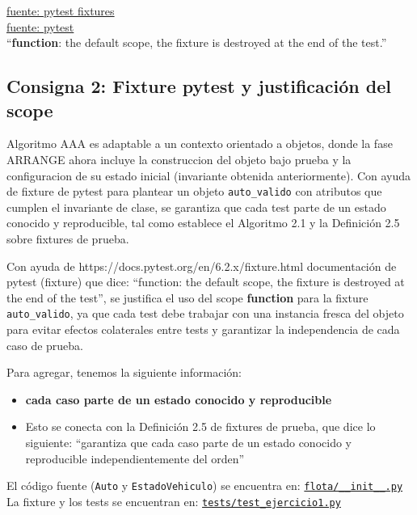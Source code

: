 \href{https://docs.pytest.org/en/6.2.x/fixture.html}{fuente: pytest fixtures}\\
\href{https://docs.pytest.org/en/stable/reference/reference.html\#pytest-fixtures}{fuente: pytest }\\


``\textbf{function}: the default scope, the fixture is destroyed at the end of the test.''

\subsection{Consigna 2: Fixture pytest y justificación del scope}

Algoritmo AAA es adaptable a un contexto orientado a objetos, donde la fase ARRANGE ahora incluye la construccion del objeto bajo prueba y la configuracion de su estado inicial (invariante obtenida anteriormente).
Con ayuda de fixture de pytest para plantear un objeto \texttt{auto\_valido} con atributos que cumplen el invariante de clase, se garantiza que cada test parte de un estado conocido y reproducible, tal como establece el Algoritmo 2.1 y la Definición 2.5 sobre fixtures de prueba.

Con ayuda de https://docs.pytest.org/en/6.2.x/fixture.html documentación de pytest (fixture) que dice: ``function: the default scope, the fixture is destroyed at the end of the test'', se justifica el uso del scope \textbf{function} para la fixture \texttt{auto\_valido}, ya que cada test debe trabajar con una instancia fresca del objeto para evitar efectos colaterales entre tests y garantizar la independencia de cada caso de prueba.

Para agregar, tenemos la siguiente información:

\begin{itemize}
    \item \textbf{cada caso parte de un estado conocido y reproducible}
    \item Esto se conecta con la Definición 2.5 de fixtures de prueba, que dice lo siguiente: 
    \subitem ``garantiza que cada caso parte de un estado conocido y reproducible independientemente del orden''
\end{itemize}

El código fuente (\texttt{Auto} y \texttt{EstadoVehiculo}) se encuentra en: \href{https://github.com/Cristopher-Ovaillos/Unidad_2_ValidacionVerificacion/blob/main/Unidad_2_code/python/flota/__init__.py}{\texttt{flota/\_\_init\_\_.py}} \\
La fixture y los tests se encuentran en: \href{https://github.com/Cristopher-Ovaillos/Unidad_2_ValidacionVerificacion/blob/main/Unidad_2_code/python/tests/test_ejercicio1.py}{\texttt{tests/test\_ejercicio1.py}}

